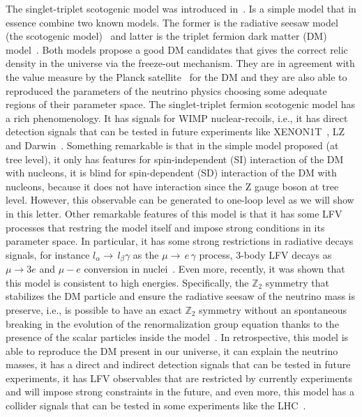 \documentclass[12pt,letterpaper]{article}
\begin{document}
The singlet-triplet scotogenic model was introduced in~\cite{Hirsch:2013ola}.
Is a simple model that in essence combine two known models. The former is the radiative seesaw model (the scotogenic model)~\cite{Ma:2006km} and latter is the triplet fermion dark matter (DM) model~\cite{Ma:2008cu}. Both models propose a good DM candidates that gives the correct relic density in the universe via the freeze-out mechanism. They are in agreement with the value measure by the Planck satellite~\cite{Aghanim:2018eyx} for the DM  and they are also able to reproduced the parameters of the neutrino physics choosing some adequate regions of their parameter space. 
The singlet-triplet fermion scotogenic model has a rich phenomenology. 
It has signals for WIMP nuclear-recoils, i.e., it has direct detection signals that can be tested in future experiments like XENON1T~\cite{Aprile:2018dbl}, LZ~\cite{Mount:2017qzi} and Darwin~\cite{Aalbers:2016jon}. Something remarkable is that in the simple model proposed (at tree level), it only has features for spin-independent (SI) interaction of the DM with nucleons, it is blind for spin-dependent (SD) interaction of the DM with nucleons, because it does not have interaction since the Z gauge boson at tree level. However, this observable can be generated to one-loop level as we will show in this letter.
%
Other remarkable features of this model is that it has some LFV processes that restring the model itself and impose strong conditions in its parameter space. In particular, it has some strong restrictions in radiative decays signals, for instance $l_{\alpha}\to\,l_{\beta}\gamma$ as the $\mu\to\,e\,\gamma$ process, 3-body LFV decays as $\mu\to 3 e$ and $\mu - e$ conversion in nuclei~\cite{Rocha-Moran:2016enp}.  
%
Even more, recently, it was shown that this model is consistent to high energies. Specifically, the $\mathbb{Z}_2$ symmetry that stabilizes the DM particle and ensure the radiative seesaw of the neutrino mass is preserve, i.e., is possible to have an exact $\mathbb{Z}_2$ symmetry without an spontaneous breaking in the evolution of the renormalization group equation thanks to the presence of the scalar particles inside the model~\cite{Merle:2016scw}.
%
In retrospective, this model is able to reproduce the DM present in our universe, it can explain the neutrino masses, it has a direct and indirect detection signals that can be tested in future experiments, it has LFV observables that are restricted by currently experiments and will impose strong constraints in the future, and even more, this model has a collider signals that can be tested in some experiments like the LHC~\cite{Choubey:2017yyn}. 
\end{document}

